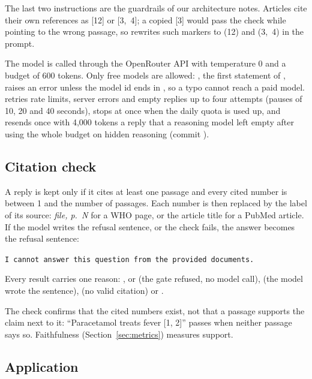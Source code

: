 The last two instructions are the guardrails of our architecture notes. Articles cite their own references as [12] or [3,~4]; a copied [3] would pass the check while pointing to the wrong passage, so  rewrites such markers to (12) and (3,~4) in the prompt.

The model is called through the OpenRouter API \citep{openrouter} with temperature 0 and a budget of 600 tokens. Only free models are allowed: , the first statement of , raises an error unless the model id ends in , so a typo cannot reach a paid model.  retries rate limits, server errors and empty replies up to four attempts (pauses of 10, 20 and 40 seconds), stops at once when the daily quota is used up, and resends once with 4,000 tokens a reply that a reasoning model left empty after using the whole budget on hidden reasoning (commit ).

\subsection{Citation check}

A reply is kept only if it cites at least one passage and every cited number is between 1 and the number of passages. Each number is then replaced by the label of its source: \emph{file, p.~N} for a WHO page, or the article title for a PubMed article. If the model writes the refusal sentence, or the check fails, the answer becomes the refusal sentence:
\begin{center}
\texttt{I cannot answer this question from the provided documents.}
\end{center}
Every result carries one reason: ,  or  (the gate refused, no model call),  (the model wrote the sentence),  (no valid citation) or .

The check confirms that the cited numbers exist, not that a passage supports the claim next to it: ``Paracetamol treats fever [1, 2]'' passes when neither passage says so. Faithfulness (Section~\ref{sec:metrics}) measures support.

\subsection{Application}

